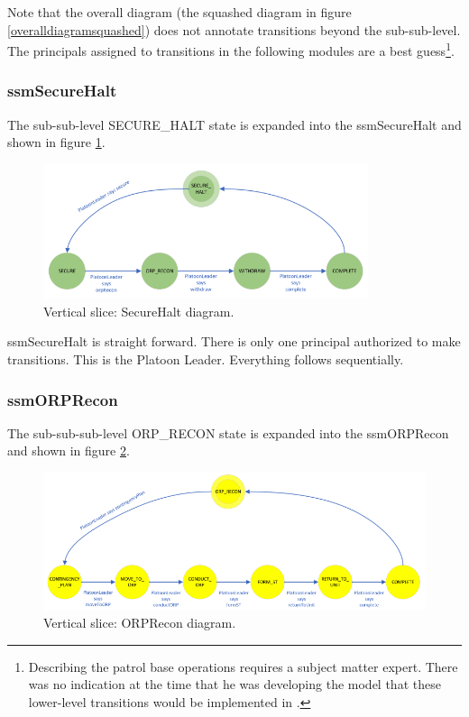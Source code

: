 \documentclass[../../main/main.tex]{subfiles}
\begin{document}
Note that the overall diagram (the squashed diagram in figure \ref{overalldiagramsquashed}) does not annotate transitions beyond the sub-sub-level. The principals assigned to transitions in the following modules are a best guess\footnote{Describing the patrol base operations requires a subject matter expert.  There was no indication at the time that he was developing the model that these lower-level transitions would be implemented in .}.  

\clearpage
\subsubsection{ssmSecureHalt}\label{sssec:ssmSecureHalt}
The sub-sub-level SECURE_HALT state is expanded into the ssmSecureHalt  and shown in figure \ref{ssmSecurtHaltDiagram}.

\begin{figure}[h!]
\centering
\includegraphics[width=0.85\textwidth]{../figures/ssmSecurtHaltDiagram}
\caption{\label{ssmSecurtHaltDiagram} Vertical slice: SecureHalt diagram.}
\end{figure}

ssmSecureHalt is straight forward. There is only one principal authorized to make transitions.  This is the Platoon Leader.  Everything follows sequentially.  
\clearpage

\subsubsection{ssmORPRecon}\label{sssec:ssmORPRecon}
The sub-sub-sub-level ORP_RECON state is expanded into the ssmORPRecon  and shown in figure \ref{ssmORPReconDiagram}.

\begin{figure}[h!]
\centering
\includegraphics[width=\textwidth]{../figures/ssmORPReconDiagram}
\caption{\label{ssmORPReconDiagram} Vertical slice: ORPRecon diagram.}
\end{figure}
\end{document}
